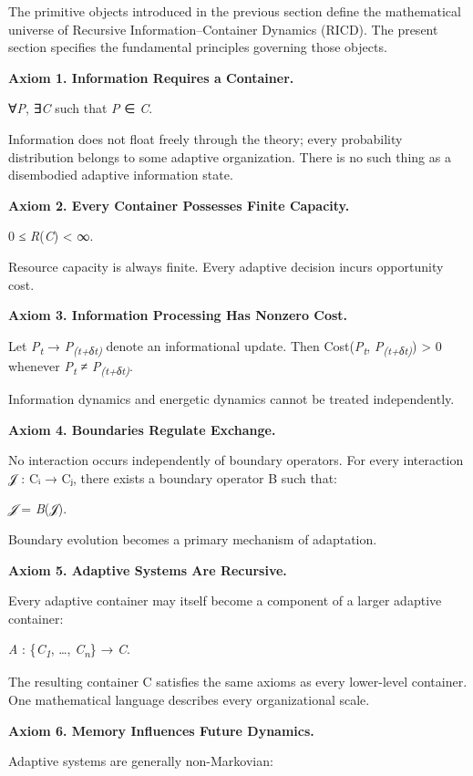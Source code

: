 \documentclass[
]{article}
\begin{document}
The primitive objects introduced in the previous section define the
mathematical universe of Recursive Information--Container Dynamics
(RICD). The present section specifies the fundamental principles
governing those objects.

\textbf{Axiom 1. Information Requires a Container.}

∀\emph{P}, ∃\emph{C} such that \emph{P} ∈ \emph{C}.

Information does not float freely through the theory; every probability
distribution belongs to some adaptive organization. There is no such
thing as a disembodied adaptive information state.

\textbf{Axiom 2. Every Container Possesses Finite Capacity.}

0 ≤ \emph{R}(\emph{C}) \textless{} ∞.

Resource capacity is always finite. Every adaptive decision incurs
opportunity cost.

\textbf{Axiom 3. Information Processing Has Nonzero Cost.}

Let \emph{P\textsubscript{t}} → \emph{P\textsubscript{(t+δt)}} denote an
informational update. Then Cost(\emph{P\textsubscript{t}},
\emph{P\textsubscript{(t+δt)}}) \textgreater{} 0 whenever
\emph{P\textsubscript{t}} ≠ \emph{P\textsubscript{(t+δt)}}.

Information dynamics and energetic dynamics cannot be treated
independently.

\textbf{Axiom 4. Boundaries Regulate Exchange.}

No interaction occurs independently of boundary operators. For every
interaction 𝒥 : Cᵢ → Cⱼ, there exists a boundary operator B such that:

\emph{𝒥} = \emph{B}(𝒥).

Boundary evolution becomes a primary mechanism of adaptation.

\textbf{Axiom 5. Adaptive Systems Are Recursive.}

Every adaptive container may itself become a component of a larger
adaptive container:

\emph{A} : \{\emph{C\textsubscript{1}}, \ldots,
\emph{C\textsubscript{n}}\} → \emph{C}.

The resulting container C satisfies the same axioms as every lower-level
container. One mathematical language describes every organizational
scale.

\textbf{Axiom 6. Memory Influences Future Dynamics.}

Adaptive systems are generally non-Markovian:
\end{document}
